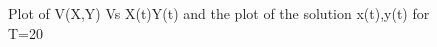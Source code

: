 \documentclass[twoside,12pt]{article}
\begin{document}
{\begin{figure}[htbp!]
\begin{center}
{                    }\\%
                    \\ %
    \end{center}
    \caption{%
     Plot of V(X,Y) Vs X(t)Y(t) and the plot of the solution x(t),y(t) for T=20
     }%
   \label{fig:proj_1_g_t_20}
\end{figure}
}

\FloatBarrier
\end{document}
